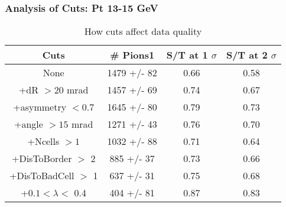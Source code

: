 \frame
{
\frametitle{Analysis of Cuts: Pt 13-15 GeV}
\begin{table}
\caption{How cuts affect data quality}
\centering
\begin{tabular}{c c c c}
\hline\hline
Cuts & \# Pions1 & S/T at 1 $\sigma$ & S/T at 2 $\sigma$ \\ [0.5ex]
\hline
None & 1479 +/-   82 & 0.66 & 0.58 \\ %
+dR $> 20$ mrad & 1457 +/-   69 & 0.74 & 0.67 \\ %
+asymmetry $< 0.7$ & 1645 +/-   80 & 0.79 & 0.73 \\ %
+angle $> 15$ mrad & 1271 +/-   43 & 0.76 & 0.70 \\ %
+Ncells $> 1$& 1032 +/-   88 & 0.71 & 0.64 \\ %
+DisToBorder $>$ 2 &  885 +/-   37 & 0.73 & 0.66 \\ %
+DisToBadCell $>$ 1&  637 +/-   31 & 0.75 & 0.68 \\ %
+$0.1 < \lambda <$ 0.4 &  404 +/-   81 & 0.87 & 0.83 \\ %
[1ex]
\hline
\end{tabular}
\label{table:nonlin}
\end{table}
}
